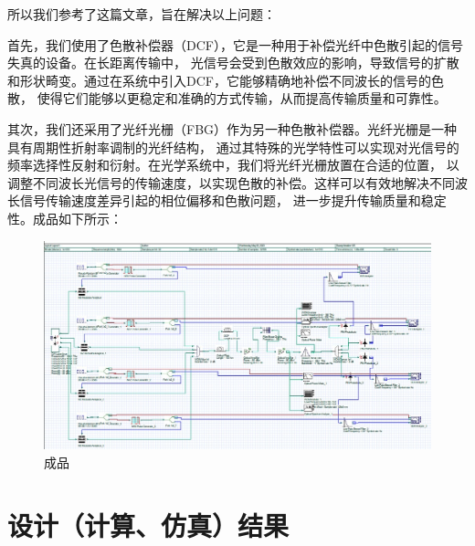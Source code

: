 \documentclass[12pt]{article}
\begin{document}
所以我们参考了这篇文章\cite{BHATTACHARJEE2022168598}，旨在解决以上问题：

首先，我们使用了色散补偿器（DCF），它是一种用于补偿光纤中色散引起的信号失真的设备。在长距离传输中，
光信号会受到色散效应的影响，导致信号的扩散和形状畸变。通过在系统中引入DCF，它能够精确地补偿不同波长的信号的色散，
使得它们能够以更稳定和准确的方式传输，从而提高传输质量和可靠性。

其次，我们还采用了光纤光栅（FBG）作为另一种色散补偿器。光纤光栅是一种具有周期性折射率调制的光纤结构，
通过其特殊的光学特性可以实现对光信号的频率选择性反射和衍射。在光学系统中，我们将光纤光栅放置在合适的位置，
以调整不同波长光信号的传输速度，以实现色散的补偿。这样可以有效地解决不同波长信号传输速度差异引起的相位偏移和色散问题，
进一步提升传输质量和稳定性。成品如下所示：

\begin{figure}[H]
	\centering
	\includegraphics[scale=0.3]{figure6.png}
  \caption{成品}
\end{figure}

\clearpage
\section{设计（计算、仿真）结果}
\end{document}

